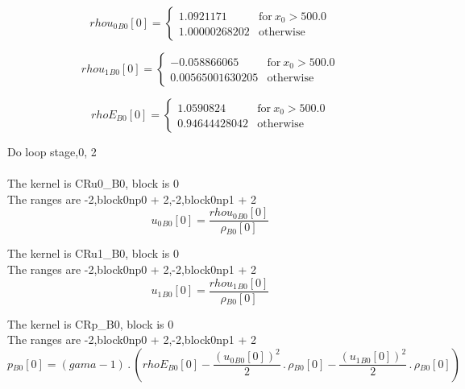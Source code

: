 \documentclass{article}
\begin{document}
\begin{dmath}{rhou_{0}{_{B0}}}[{0}] = \begin{cases} 1.0921171 & \text{for}\: x_{0} > 500.0 \\1.00000268202 & \text{otherwise} \end{cases}\end{dmath}

\begin{dmath}{rhou_{1}{_{B0}}}[{0}] = \begin{cases} -0.058866065 & \text{for}\: x_{0} > 500.0 \\0.00565001630205 & \text{otherwise} \end{cases}\end{dmath}

\begin{dmath}{rhoE{_{B0}}}[{0}] = \begin{cases} 1.0590824 & \text{for}\: x_{0} > 500.0 \\0.94644428042 & \text{otherwise} \end{cases}\end{dmath}

\noindent Do loop stage,0, 2\\
\\\noindent The kernel is CRu0_B0, block is 0\\\noindent The ranges are -2,block0np0 + 2,-2,block0np1 + 2\\\begin{dmath}{u_{0}{_{B0}}}[{0}] = \frac{{rhou_{0}{_{B0}}}[{0}]}{{\rho{_{B0}}}[{0}]}\end{dmath}

\noindent The kernel is CRu1_B0, block is 0\\\noindent The ranges are -2,block0np0 + 2,-2,block0np1 + 2\\\begin{dmath}{u_{1}{_{B0}}}[{0}] = \frac{{rhou_{1}{_{B0}}}[{0}]}{{\rho{_{B0}}}[{0}]}\end{dmath}

\noindent The kernel is CRp_B0, block is 0\\\noindent The ranges are -2,block0np0 + 2,-2,block0np1 + 2\\\begin{dmath}{p{_{B0}}}[{0}] = \left(gama - 1\right) \,.\, \left({rhoE{_{B0}}}[{0}] - \frac{\left({u_{0}{_{B0}}}[{0}] \right)^{2}}{2} \,.\, {\rho{_{B0}}}[{0}] - \frac{\left({u_{1}{_{B0}}}[{0}] \right)^{2}}{2} \,.\, 
{\rho{_{B0}}}[{0}]\right)\end{dmath}
\end{document}

